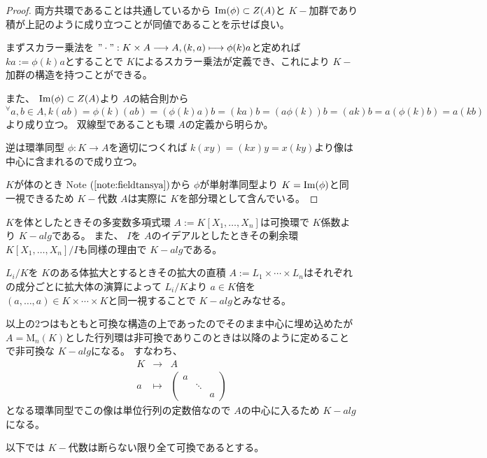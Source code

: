 \documentclass[../master_galois_theory]{subfiles}
\begin{document}
\begin{proof}
  両方共環であることは共通しているから $\mathrm{Im}(\phi) \subset Z(A)$と $K-$加群であり積が上記のように成り立つことが同値であることを示せば良い。

  まずスカラー乗法を $" \cdot " : K \times A \longrightarrow A , (k , a) \longmapsto \phi(k)a$と定めれば $ka := \phi(k)a$とすることで $K$によるスカラー乗法が定義でき、これにより $K-$加群の構造を持つことができる。

  また、 $\mathrm{Im}(\phi) \subset Z(A)$より $A$の結合則から ${}^\forall a , b \in A , k(ab) = \phi(k)(ab) = (\phi(k)a)b = (ka)b = (a\phi(k))b = (ak)b = a(\phi(k)b) = a(kb)$より成り立つ。
  双線型であることも環 $A$の定義から明らか。

  逆は環準同型 $\phi : K \longrightarrow A$を適切につくれば $k(xy) = (kx)y = x(ky)$より像は中心に含まれるので成り立つ。

  $K$が体のとき \rm{Note} $(\mathrm{\ref{note:fieldtansya}})$から $\phi$が単射準同型より $K = \mathrm{Im}(\phi)$と同一視できるため $K-$代数 $A$は実際に $K$を部分環として含んでいる。
\end{proof}

\begin{exam}
  $K$を体としたときその多変数多項式環 $A := K[X_1 , \dots , X_n]$は可換環で $K$係数より $K-alg$である。
  また、 $I$を $A$のイデアルとしたときその剰余環 $K[X_1 , \dots , X_n]/I$も同様の理由で $K-alg$である。

  $L_i/K$を $K$のある体拡大とするときその拡大の直積 $A := L_1 \times \cdots \times L_n$はそれぞれの成分ごとに拡大体の演算によって $L_i/K$より $a \in K$倍を $(a , \dots , a) \in K \times \cdots \times K$と同一視することで $K-alg$とみなせる。

  以上の2つはもともと可換な構造の上であったのでそのまま中心に埋め込めたが $A = \mathrm{M}_n(K)$とした行列環は非可換でありこのときは以降のように定めることで非可換な $K-alg$になる。
  すなわち、
  \begin{eqnarray*}
    K & \longrightarrow & A \\
    a & \longmapsto &
    \begin{pmatrix}
      a &  & \\
        & \ddots & \\
        &  & a
    \end{pmatrix}
  \end{eqnarray*}
  となる環準同型でこの像は単位行列の定数倍なので $A$の中心に入るため $K-alg$になる。
\end{exam}

以下では $K-$代数は断らない限り全て可換であるとする。
\end{document}
